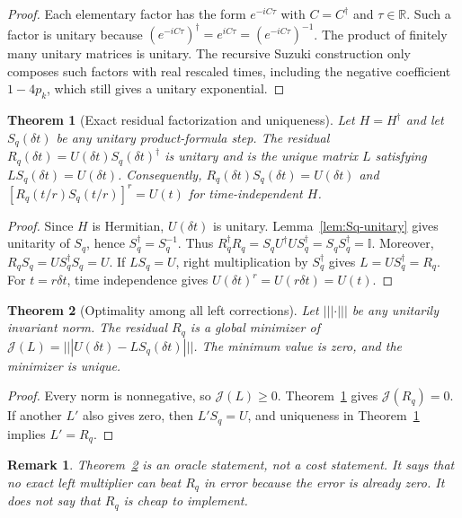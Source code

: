 \documentclass[aps,prxquantum,reprint,superscriptaddress,nofootinbib,amsmath,amssymb]{revtex4-2}
\newcommand{\id}{\mathbb{I}}
\newcommand{\dt}{\delta t}
\newtheorem{theorem}{Theorem}
\newtheorem{remark}{Remark}
\begin{document}
\begin{proof}
Each elementary factor has the form $e^{-iC\tau}$ with $C=C^\dagger$ and $\tau\in\mathbb{R}$. Such a factor is unitary because $(e^{-iC\tau})^\dagger=e^{iC\tau}=(e^{-iC\tau})^{-1}$. The product of finitely many unitary matrices is unitary. The recursive Suzuki construction only composes such factors with real rescaled times, including the negative coefficient $1-4p_k$, which still gives a unitary exponential.
\end{proof}

\begin{theorem}[Exact residual factorization and uniqueness]
\label{thm:factorization}
Let $H=H^\dagger$ and let $S_q(\dt)$ be any unitary product-formula step. The residual $R_q(\dt)=U(\dt)S_q(\dt)^\dagger$ is unitary and is the unique matrix $L$ satisfying $LS_q(\dt)=U(\dt)$. Consequently, $R_q(\dt)S_q(\dt)=U(\dt)$ and $[R_q(t/r)S_q(t/r)]^r=U(t)$ for time-independent $H$.
\end{theorem}

\begin{proof}
Since $H$ is Hermitian, $U(\dt)$ is unitary. Lemma~\ref{lem:Sq-unitary} gives unitarity of $S_q$, hence $S_q^\dagger=S_q^{-1}$. Thus $R_q^\dagger R_q=S_qU^\dagger US_q^\dagger=S_qS_q^\dagger=\id$. Moreover, $R_qS_q=U S_q^\dagger S_q=U$. If $L S_q=U$, right multiplication by $S_q^\dagger$ gives $L=US_q^\dagger=R_q$. For $t=r\dt$, time independence gives $U(\dt)^r=U(r\dt)=U(t)$.
\end{proof}

\begin{theorem}[Optimality among all left corrections]
\label{thm:optimality}
Let $|||\cdot|||$ be any unitarily invariant norm. The residual $R_q$ is a global minimizer of $\mathcal{J}(L)=|||U(\dt)-LS_q(\dt)|||$. The minimum value is zero, and the minimizer is unique.
\end{theorem}

\begin{proof}
Every norm is nonnegative, so $\mathcal{J}(L)\geq0$. Theorem~\ref{thm:factorization} gives $\mathcal{J}(R_q)=0$. If another $L'$ also gives zero, then $L'S_q=U$, and uniqueness in Theorem~\ref{thm:factorization} implies $L'=R_q$.
\end{proof}

\begin{remark}
Theorem~\ref{thm:optimality} is an oracle statement, not a cost statement. It says that no exact left multiplier can beat $R_q$ in error because the error is already zero. It does not say that $R_q$ is cheap to implement.
\end{remark}
\end{document}
